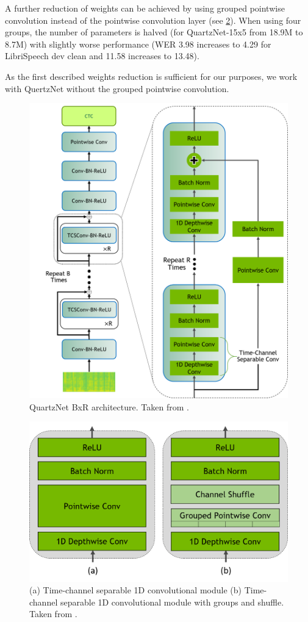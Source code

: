 A further reduction of weights can be achieved by using grouped pointwise convolution instead of the pointwise convolution layer (see  \cref{fig:quartz_arch_groups}). When using four groups, the number of parameters is halved (for QuartzNet-15x5 from 18.9M to 8.7M) with slightly worse performance (WER 3.98 increases to 4.29 for LibriSpeech dev clean and 11.58 increases to 13.48).

As the first described weights reduction is sufficient for our purposes, we work with QuertzNet without the grouped pointwise convolution.

\begin{figure}[h]
	\centering
	\includegraphics[width=\linewidth]{img/QuartzNet_v2.png}
	\caption{QuartzNet BxR architecture. Taken from .}
	\label{fig:quartz_arch}
\end{figure}

\begin{figure}[h]
	\centering
	\includegraphics[width=0.8\linewidth]{img/QuartzNet_Grouped_v2.png}
	\caption{(a) Time-channel separable 1D convolutional module (b) Time-channel separable 1D convolutional module with groups and shuffle. Taken from .}
	\label{fig:quartz_arch_groups}
\end{figure}


